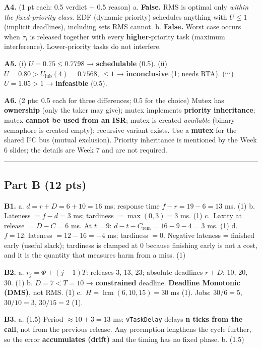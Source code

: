 \documentclass[
  11pt,
]{article}
\begin{document}
\textbf{A4.} (1 pt each: 0.5 verdict + 0.5 reason) a. \textbf{False.}
RMS is optimal only \emph{within the fixed-priority class}. EDF (dynamic
priority) schedules anything with \(U \le 1\) (implicit deadlines),
including sets RMS cannot. b. \textbf{False.} Worst case occurs when
\(\tau_i\) is released together with every \textbf{higher}-priority task
(maximum interference). Lower-priority tasks do not interfere.

\textbf{A5.} (i) \(U = 0.75 \le 0.7798\) → \textbf{schedulable} (0.5).
(ii) \(U = 0.80 > U_{\text{lub}}(4) = 0.7568\), \(\le 1\) →
\textbf{inconclusive} (1; needs RTA). (iii) \(U = 1.05 > 1\) →
\textbf{infeasible} (0.5).

\textbf{A6.} (2 pts: 0.5 each for three differences; 0.5 for the choice)
Mutex has \textbf{ownership} (only the taker may give); mutex implements
\textbf{priority inheritance}; mutex \textbf{cannot be used from an
ISR}; mutex is created \emph{available} (binary semaphore is created
empty); recursive variant exists. Use a \textbf{mutex} for the shared
I²C bus (mutual exclusion). Priority inheritance is mentioned by the
Week 6 slides; the details are Week 7 and are not required.

\begin{center}\rule{0.5\linewidth}{0.5pt}\end{center}

\subsection{Part B (12 pts)}\label{part-b-12-pts}

\textbf{B1.} a. \(d = r + D = 6 + 10 = 16\) ms; response time
\(f - r = 19 - 6 = 13\) ms. (1) b. Lateness \(= f - d = 3\) ms;
tardiness \(= \max(0, 3) = 3\) ms. (1) c.~Laxity at release
\(= D - C = 6\) ms. At \(t = 9\):
\(d - t - C_{\text{rem}} = 16 - 9 - 4 = 3\) ms. (1) d.~\(f = 12\):
lateness \(= 12 - 16 = -4\) ms; tardiness \(= 0\). Negative lateness =
finished early (useful slack); tardiness is clamped at 0 because
finishing early is not a cost, and it is the quantity that measures harm
from a miss. (1)

\textbf{B2.} a. \(r_{j} = \Phi + (j-1)T\): releases 3, 13, 23; absolute
deadlines \(r + D\): 10, 20, 30. (1) b. \(D = 7 < T = 10\) →
\textbf{constrained} deadline. \textbf{Deadline Monotonic (DMS)}, not
RMS. (1) c.~\(H = \operatorname{lcm}(6, 10, 15) = 30\) ms (1). Jobs:
\(30/6 = 5\), \(30/10 = 3\), \(30/15 = 2\) (1).

\textbf{B3.} a. (1.5) Period \(\approx 10 + 3 = 13\) ms:
\texttt{vTaskDelay} delays \textbf{n ticks from the call}, not from the
previous release. Any preemption lengthens the cycle further, so the
error \textbf{accumulates (drift)} and the timing has no fixed phase. b.
(1.5)
\end{document}
